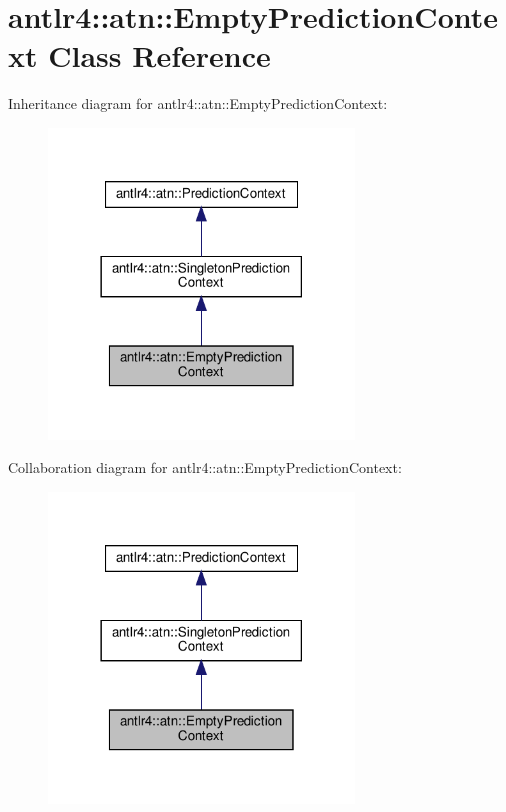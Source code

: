 \hypertarget{classantlr4_1_1atn_1_1EmptyPredictionContext}{}\section{antlr4\+:\+:atn\+:\+:Empty\+Prediction\+Context Class Reference}
\label{classantlr4_1_1atn_1_1EmptyPredictionContext}


Inheritance diagram for antlr4\+:\+:atn\+:\+:Empty\+Prediction\+Context\+:
\nopagebreak
\begin{figure}[H]
\begin{center}
\leavevmode
\includegraphics[width=230pt]{classantlr4_1_1atn_1_1EmptyPredictionContext__inherit__graph}
\end{center}
\end{figure}


Collaboration diagram for antlr4\+:\+:atn\+:\+:Empty\+Prediction\+Context\+:
\nopagebreak
\begin{figure}[H]
\begin{center}
\leavevmode
\includegraphics[width=230pt]{classantlr4_1_1atn_1_1EmptyPredictionContext__coll__graph}
\end{center}
\end{figure}
